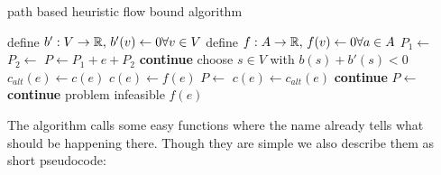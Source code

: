 \begin{algorithm}
 \caption{path based heuristic flow bound algorithm}
\label{algo:pathHeur}
 \begin{algorithmic}[5]%
    \State define $b':V\to \mathbb{R},\, b'(v)\gets 0 \forall v\in V$ 
    \State define $f: A\to\mathbb{R},\, f(v)\gets 0 \forall a\in A$
	\State $P_1\gets $
	\State $P_2\gets $
	  \State $P\gets P_1+e+P_2$
	  \State {}\label{heur:lineAugCase1}
	  \State \textbf{continue}
	\EndIf
      \EndIf
	\State choose $s\in V$ with $b(s)+b'(s)<0$
	\State $c_{alt}(e)\gets c(e)$
	\State $c(e)\gets f(e)$
	\State $P\gets$
	\State $c(e)\gets c_{alt}(e)$
	  \State {}\label{heur:lineAugCase2}
	  \State \textbf{continue}
	\Else
	  \State $P\gets$ 
	    \State {}\label{heur:lineAugCase3}
	    \State \textbf{continue}
	  \Else
	    \State \Return problem infeasible
	  \EndIf
	\EndIf
    \EndWhile
    \State \Return $f(e)$
  \EndFunction
 \end{algorithmic}

\end{algorithm}%
The algorithm calls some easy functions where the name already tells what should be happening there. Though they are 
simple we also describe them as short pseudocode:

